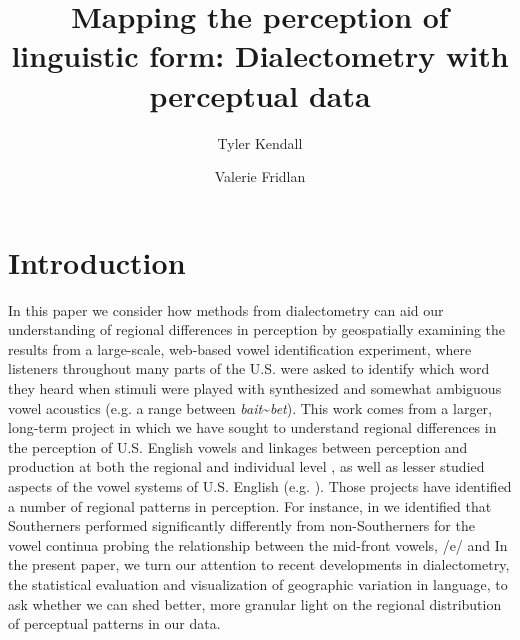 \documentclass[output=paper]{LSP/langsci}
\author{Tyler Kendall\affiliation{University of Oregon}\and Valerie Fridlan\affiliation{University of Nevada, Reno}}
\title{Mapping the perception of linguistic form: Dialectometry with perceptual data}
\begin{document}
 

% 
% 
% 
% 
 
\section{Introduction}

In this paper we consider how methods from dialectometry can aid our understanding of regional differences in perception by geospatially examining the results from a large-scale, web-based vowel identification experiment, where listeners throughout many parts of the U.S. were asked to identify which word they heard when stimuli were played with synthesized and somewhat ambiguous vowel acoustics (e.g. a range between \textit{bait}\~{}\textit{bet}). This work comes from a larger, long-term project in which we have sought to understand regional differences in the perception of U.S. English vowels and linkages between perception and production at both the regional and individual level \citep{fridland_exploring_2012,kendall_mapping_2010,kendall_variation_2012}, as well as lesser studied aspects of the vowel systems of U.S. English (e.g. \citealt{fridland_durational_2014}). Those projects have identified a number of regional patterns in perception. For instance, in \cite{kendall_variation_2012} we identified that Southerners performed significantly differently from non-Southerners for the vowel continua probing the relationship between the mid-front vowels, /e/ and 
In the present paper, we turn our attention to recent developments in dialectometry, the statistical evaluation and visualization of geographic variation in language, to ask whether we can shed better, more granular light on the regional distribution of perceptual patterns in our data. 
\end{document}
